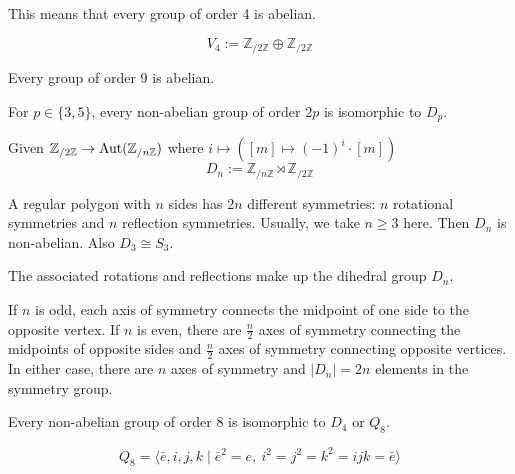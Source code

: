 This means that every group of order 4 is abelian.

\begin{definition}
   \[V_4 := \mathbb{Z}_{/2\mathbb{Z}} \oplus \mathbb{Z}_{/2\mathbb{Z}}\]
\end{definition}

\begin{proposition}
   Every group of order 9 is abelian.
\end{proposition}

\begin{proposition}
   For \(p \in \{3, 5\}\), every non-abelian group of order \(2p\) is isomorphic to \(D_p\).
\end{proposition}

\begin{definition}
   Given \(\mathbb{Z}_{/2\mathbb{Z}} \to \operatorname{Aut}(\mathbb{Z}_{/n\mathbb{Z}})\) where \(i \mapsto ([m] \mapsto (-1)^i \cdot [m])\)
   \[D_n := \mathbb{Z}_{/n\mathbb{Z}} \rtimes \mathbb{Z}_{/2\mathbb{Z}}\]
\end{definition}
\begin{remark}[Intuition]
   A regular polygon with \(n\) sides has \(2n\) different symmetries: \(n\) rotational symmetries and \(n\) reflection symmetries.
   Usually, we take \(n \geq 3\) here.
   Then \(D_n\) is non-abelian.
   Also \(D_3 \cong S_3\).

   The associated rotations and reflections make up the dihedral group \(D_n\).

   \begin{center}
      
   \end{center}

   If \(n\) is odd, each axis of symmetry connects the midpoint of one side to the opposite vertex.
   If \(n\) is even, there are \(\frac{n}{2}\) axes of symmetry connecting the midpoints of opposite sides and \(\frac{n}{2}\) axes of symmetry connecting opposite vertices.
   In either case, there are \(n\) axes of symmetry and \(|D_n| = 2n\) elements in the symmetry group.
\end{remark}

\begin{proposition}
   Every non-abelian group of order 8 is isomorphic to \(D_4\) or \(Q_8\).
\end{proposition}

\begin{definition}
   \[Q_8 = \langle \bar{e},i,j,k \mid \bar{e}^{2} = e,~ i^2 = j^2 = k^2 = ijk = \bar{e}\rangle\]
\end{definition}

